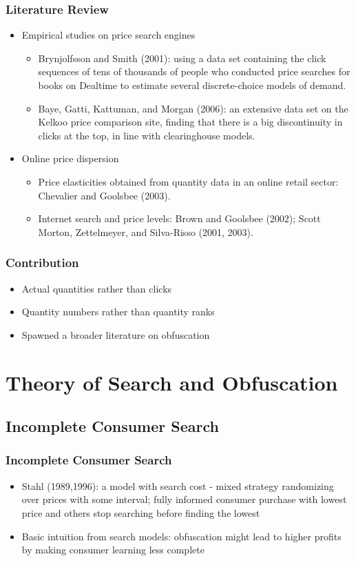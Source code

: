 \documentclass{beamer}
\begin{document}
\begin{frame}[allowframebreaks]
\frametitle{Literature Review}
\begin{itemize}
\item Empirical studies on price search engines
  \begin{itemize}
  \item Brynjolfsson and Smith (2001): using a data set containing the click sequences of tens of thousands of people who conducted price searches for books on
Dealtime to estimate several discrete-choice models of demand.
  \item Baye, Gatti, Kattuman, and Morgan (2006): an extensive data set on the Kelkoo price comparison site, finding that there is a big discontinuity in
  clicks at the top, in line with clearinghouse models.
  \end{itemize}
  
\framebreak
  
\item Online price dispersion
  \begin{itemize}
  \item Price elasticities obtained from quantity data in an online retail sector: Chevalier and Goolsbee (2003).
  \item Internet search and price levels: Brown and Goolsbee (2002); Scott Morton, Zettelmeyer, and Silva-Risso (2001, 2003).
  \end{itemize}
  
\end{itemize}
\end{frame}

\begin{frame}
\frametitle{Contribution}
\begin{itemize}
  \item Actual quantities rather than clicks
  \item Quantity numbers rather than quantity ranks
  \item Spawned a broader literature on obfuscation
\end{itemize}
\end{frame}

\section{Theory of Search and Obfuscation}
\subsection{Incomplete Consumer Search}
\begin{frame}
\frametitle{Incomplete Consumer Search}
\begin{itemize}
  \item Stahl (1989,1996): a model with search cost - mixed strategy randomizing over prices with some interval; fully informed consumer purchase with lowest price and others stop searching before finding the lowest
  \item Basic intuition from search models: obfuscation might lead to higher profits by making consumer learning less complete
\end{itemize}
\end{frame}
\end{document}
